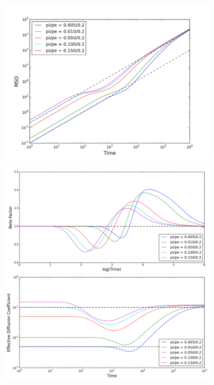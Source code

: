 	\begin{figure}[h]
		\centering
		\includegraphics[width=1.0\linewidth]{../images/2D/pipe_msd_2D}
		\caption{}
		\label{fig:pipe_msd_2D}
	\end{figure}
	
	\begin{figure}[h]
		\centering
		\includegraphics[width=1.0\linewidth]{../images/2D/pipe_beta_deff_2D}
		\caption{}
		\label{fig:pipe_beta_deff_2D}
	\end{figure}
	
